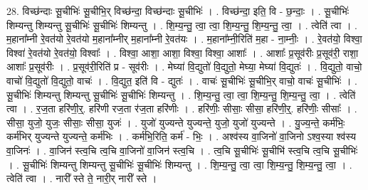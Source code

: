 \documentclass[17pt]{extarticle}
\begin{document}
28. विच्छ॑न्दाः सू॒चीभिः॑ सू॒चीभि॒र् विच्छ॑न्दा॒ विच्छ॑न्दाः सू॒चीभिः॑ । . विच्छ॑न्दा॒ इति॒ वि - छ॒न्दाः॒ । . सू॒चीभिः॑ शिम्यन्तु शिम्यन्तु सू॒चीभिः॑ सू॒चीभिः॑ शिम्यन्तु । . शि॒म्य॒न्तु॒ त्वा॒ त्वा॒ शि॒म्य॒न्तु॒ शि॒म्य॒न्तु॒ त्वा॒ । . त्वेति॑ त्वा । . म॒हाना᳚म्नी रे॒वत॑यो रे॒वत॑यो म॒हाना᳚म्नीर् म॒हाना᳚म्नी रे॒वत॑यः । . म॒हाना᳚म्नी॒रिति॑ म॒हा - ना॒म्नीः॒ । . रे॒वत॑यो॒ विश्वा॒ विश्वा॑ रे॒वत॑यो रे॒वत॑यो॒ विश्वाः᳚ । . विश्वा॒ आशा॒ आशा॒ विश्वा॒ विश्वा॒ आशाः᳚ । . आशाः᳚ प्र॒सूव॑रीः प्र॒सूव॑री॒ राशा॒ आशाः᳚ प्र॒सूव॑रीः । . प्र॒सूव॑री॒रिति॑ प्र - सूव॑रीः । . मेघ्या॑ वि॒द्युतो॑ वि॒द्युतो॒ मेघ्या॒ मेघ्या॑ वि॒द्युतः॑ । . वि॒द्युतो॒ वाचो॒ वाचो॑ वि॒द्युतो॑ वि॒द्युतो॒ वाचः॑ । . वि॒द्युत॒ इति॑ वि - द्युतः॑ । . वाचः॑ सू॒चीभिः॑ सू॒चीभि॒र् वाचो॒ वाचः॑ सू॒चीभिः॑ । . सू॒चीभिः॑ शिम्यन्तु शिम्यन्तु सू॒चीभिः॑ सू॒चीभिः॑ शिम्यन्तु । . शि॒म्य॒न्तु॒ त्वा॒ त्वा॒ शि॒म्य॒न्तु॒ शि॒म्य॒न्तु॒ त्वा॒ । . त्वेति॑ त्वा । . र॒ज॒ता हरि॑णी॒र्॒. हरि॑णी रज॒ता र॑ज॒ता हरि॑णीः । . हरि॑णीः॒ सीसाः॒ सीसा॒ हरि॑णी॒र्॒. हरि॑णीः॒ सीसाः᳚ । . सीसा॒ युजो॒ युजः॒ सीसाः॒ सीसा॒ युजः॑ । . युजो॑ युज्यन्ते युज्यन्ते॒ युजो॒ युजो॑ युज्यन्ते । . यु॒ज्य॒न्ते॒ कर्म॑भिः॒ कर्म॑भिर् युज्यन्ते युज्यन्ते॒ कर्म॑भिः । . कर्म॑भि॒रिति॒ कर्म॑ - भिः॒ । . अश्व॑स्य वा॒जिनो॑ वा॒जिनो ऽश्व॒स्या श्व॑स्य वा॒जिनः॑ । . वा॒जिन॑ स्त्व॒चि त्व॒चि वा॒जिनो॑ वा॒जिन॑ स्त्व॒चि । . त्व॒चि सू॒चीभिः॑ सू॒चीभि॑ स्त्व॒चि त्व॒चि सू॒चीभिः॑ । . सू॒चीभिः॑ शिम्यन्तु शिम्यन्तु सू॒चीभिः॑ सू॒चीभिः॑ शिम्यन्तु । . शि॒म्य॒न्तु॒ त्वा॒ त्वा॒ शि॒म्य॒न्तु॒ शि॒म्य॒न्तु॒ त्वा॒ । . त्वेति॑ त्वा । . नारी᳚ स्ते ते॒ नारी॒र् नारी᳚ स्ते । \newline
\end{document}
